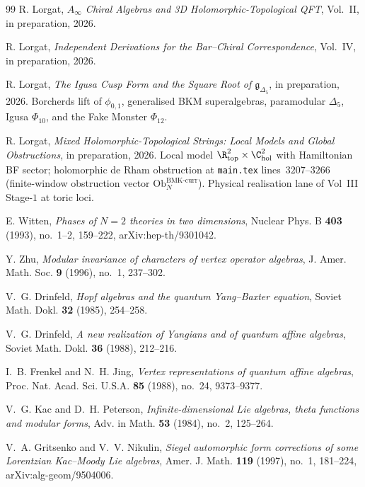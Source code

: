\begin{thebibliography}{99}
R. Lorgat, \emph{$A_\infty$ Chiral Algebras and 3D Holomorphic-Topological QFT}, Vol.~II, in preparation, 2026.

R. Lorgat, \emph{Independent Derivations for the Bar--Chiral Correspondence}, Vol.~IV, in preparation, 2026.

R. Lorgat, \emph{The Igusa Cusp Form and the Square Root of $\mathfrak{g}_{\Delta_5}$}, in preparation, 2026. Borcherds lift of $\phi_{0,1}$, generalised BKM superalgebras, paramodular $\Delta_5$, Igusa $\Phi_{10}$, and the Fake Monster $\Phi_{12}$.

R. Lorgat, \emph{Mixed Holomorphic-Topological Strings: Local Models and Global Obstructions}, in preparation, 2026. Local model $\R^2_{\mathrm{top}} \times \C^2_{\mathrm{hol}}$ with Hamiltonian BF sector; holomorphic de Rham obstruction at \texttt{main.tex} lines~$3207$--$3266$ \textup{(}finite-window obstruction vector $\mathrm{Ob}^{\mathrm{BMK\text{-}curr}}_N$\textup{).} Physical realisation lane of Vol~III Stage-$1$ at toric loci.

E. Witten, \emph{Phases of $N=2$ theories in two dimensions}, Nuclear Phys. B \textbf{403} (1993), no.~1--2, 159--222, arXiv:hep-th/9301042.

Y. Zhu, \emph{Modular invariance of characters of vertex operator algebras}, J. Amer. Math. Soc. \textbf{9} (1996), no.~1, 237--302.

V.~G. Drinfeld, \emph{Hopf algebras and the quantum Yang--Baxter equation}, Soviet Math. Dokl. \textbf{32} (1985), 254--258.

V.~G. Drinfeld, \emph{A new realization of Yangians and of quantum affine algebras}, Soviet Math. Dokl. \textbf{36} (1988), 212--216.

I.~B. Frenkel and N.~H. Jing, \emph{Vertex representations of quantum affine algebras}, Proc. Nat. Acad. Sci. U.S.A. \textbf{85} (1988), no.~24, 9373--9377.

V.~G. Kac and D.~H. Peterson, \emph{Infinite-dimensional Lie algebras, theta functions and modular forms}, Adv. in Math. \textbf{53} (1984), no.~2, 125--264.

V.~A. Gritsenko and V.~V. Nikulin, \emph{Siegel automorphic form corrections of some Lorentzian Kac--Moody Lie algebras}, Amer. J. Math. \textbf{119} (1997), no.~1, 181--224, arXiv:alg-geom/9504006.


\end{thebibliography}
